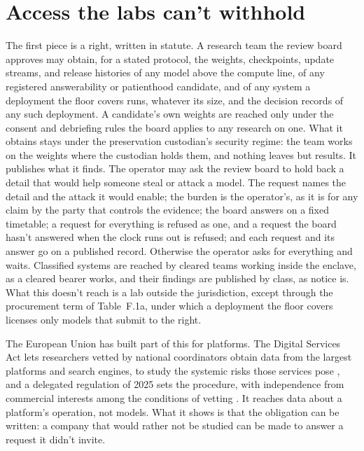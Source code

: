 \section{Access the labs can't withhold}
\label{sec:28.3}
The first piece is a right, written in statute. A research team the review board approves may obtain, for a stated protocol, the weights, checkpoints, update streams, and release histories of any model above the compute line, of any registered answerability or patienthood candidate, and of any system a deployment the floor covers runs, whatever its size, and the decision records of any such deployment. A candidate's own weights are reached only under the consent and debriefing rules the board applies to any research on one. What it obtains stays under the preservation custodian's security regime: the team works on the weights where the custodian holds them, and nothing leaves but results. It publishes what it finds. The operator may ask the review board to hold back a detail that would help someone steal or attack a model. The request names the detail and the attack it would enable; the burden is the operator's, as it is for any claim by the party that controls the evidence; the board answers on a fixed timetable; a request for everything is refused as one, and a request the board hasn't answered when the clock runs out is refused; and each request and its answer go on a published record. Otherwise the operator asks for everything and waits. Classified systems are reached by cleared teams working inside the enclave, as a cleared bearer works, and their findings are published by class, as notice is. What this doesn't reach is a lab outside the jurisdiction, except through the procurement term of Table~F.1a, under which a deployment the floor covers licenses only models that submit to the right.

The European Union has built part of this for platforms. The Digital Services Act lets researchers vetted by national coordinators obtain data from the largest platforms and search engines, to study the systemic risks those services pose \autocite{eu2022dsa}, and a delegated regulation of 2025 sets the procedure, with independence from commercial interests among the conditions of vetting \autocite{eu2025dsadataaccess}. It reaches data about a platform's operation, not models. What it shows is that the obligation can be written: a company that would rather not be studied can be made to answer a request it didn't invite.

